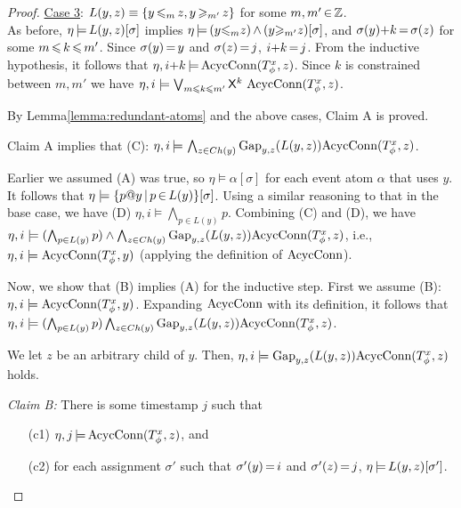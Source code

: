 \begin{proof}
\smallskip

\underline{Case 3}:
$L(y,z)\equiv \{ y \,{\leqslant_m}\, z, y \,{\geqslant_{m'}}\, z\}$
for some $m,m'\,{\in}\,\mathbb{Z}$.
\\
As before, $\eta\,{\models}\, L(y,z)[\sigma]$ implies
$\eta\,{\models}\, (y {\leqslant_m} z)\,{\wedge}\,(y {\geqslant_{m'}} z)[\sigma]$,
and $\sigma(y){+}k\,{=}\,\sigma(z)$
for some $m\,{\leqslant}\, k\,{\leqslant}\, m'$.
Since $\sigma(y)\,{=}\,y$ and $\sigma(z)\,{=}\,j$,
$i{+}k\,{=}\,j$.
From the inductive hypothesis,
it follows that
$\eta, i{+}k \,{\models}\, \text{AcycConn}(T_\phi^x,z)$.
Since $k$ is constrained between $m,m'$ we have
$\eta, i\models \bigvee_{m\leqslant k \leqslant m'}
{\sf X}^{k}\ \text{AcycConn}(T_\phi^x,z)$.

\smallskip

By Lemma\:\ref{lemma:redundant-atoms} and
the above cases,
Claim A is proved.

\smallskip

Claim A implies that (C):
$\eta,i\,{\models}\,
\bigwedge_{z\in Ch(y)} \text{Gap}_{y,z}(L(y,z))\text{AcycConn}(T_\phi^x,z)$.

Earlier we assumed (A) was true,
so
$\eta\models\alpha[\sigma]$
for each event atom $\alpha$ that uses $y$.
It follows that $\eta\models\{p@y\,|\,p\,{\in}\, L(y)\}[\sigma]$.
Using a similar reasoning to that in the base case,
we have (D) $\eta,i\models\bigwedge_{p\in L(y)}p$.
Combining (C) and (D),
we have 
$\eta,i\models (\bigwedge_{p\in L(y)}p) \land 
\bigwedge_{z\in Ch(y)} \text{Gap}_{y,z}(L(y,z)) \text{AcycConn} (T_\phi^x,z)$,
i.e.,
$\eta,i\models\text{AcycConn}(T_\phi^x,y)$
(applying the definition of $\text{AcycConn}$).

\smallskip

Now, we show that (B) implies (A) for the inductive step.
First we assume (B): $\eta,i\models\text{AcycConn}(T_\phi^x,y)$.
Expanding $\text{AcycConn}$ with its definition,
it follows that
$\eta,i\models(\bigwedge_{p\in L(y)}p) 
\bigwedge_{z\in Ch(y)} \text{Gap}_{y,z}(L(y,z))\text{AcycConn}(T_\phi^x,z)$.

We let $z$ be an arbitrary child of $y$.
Then, $\eta,i\models \text{Gap}_{y,z}(L(y,z))\text{AcycConn}(T_\phi^x,z)$ holds.

\smallskip

{\sl Claim B:}
There is some timestamp $j$
such that
\begin{enumerate}
\item[(c1)]
$\eta,j\,{\models}\, \text{AcycConn}(T_\phi^x,z)$, and
\item[(c2)]
for each assignment $\sigma'$ such that $\sigma'(y)\,{=}\,i$ and
$\sigma'(z)\,{=}\,j$, $\eta\,{\models}\, L(y,z)[\sigma']$.
\end{enumerate}


\end{proof}
